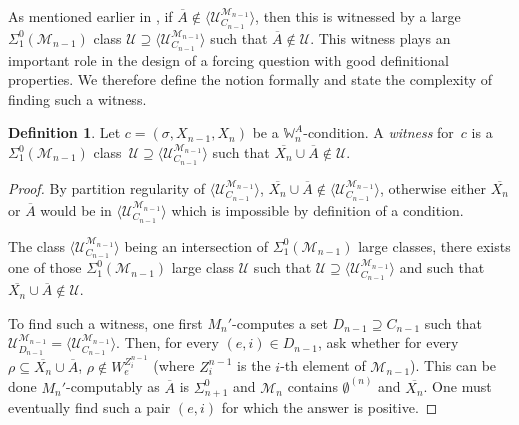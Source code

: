 \documentclass{article}
\def\WW{\mathbb{W}}
\def\U{\mathcal{U}}
\def\M{\mathcal{M}}
\numberwithin{theorem}{section}
\newtheorem{lemma}[theorem]{Lemma}
\theoremstyle{definition}
\newtheorem{definition}[theorem]{Definition}
\begin{document}
As mentioned earlier in , if $\overline{A} \not \in \langle \U_{C_{n-1}}^{\M_{n-1}} \rangle$, then this is witnessed by a large $\Sigma^0_1(\M_{n-1})$ class $\U \supseteq \langle \U_{C_{n-1}}^{\M_{n-1}} \rangle$ such that $\overline{A} \not \in \U$. This witness plays an important role in the design of a forcing question with good definitional properties. We therefore define the notion formally and state the complexity of finding such a witness.

\begin{definition}
Let $c = (\sigma, X_{n-1}, X_{n})$ be a $\WW^A_n$-condition. A \emph{witness} for~$c$ is a $\Sigma^0_1(\M_{n-1})$ class~$\U \supseteq \langle \U_{C_{n-1}}^{\M_{n-1}} \rangle$  such that $\overline{X_{n}} \cup \overline{A} \not \in \U$.
\end{definition}



\begin{proof}
By partition regularity of $\langle \U_{C_{n-1}}^{\M_{n-1}} \rangle$, $\overline{X_n} \cup \overline{A} \notin \langle \U_{C_{n-1}}^{\M_{n-1}} \rangle$, otherwise either $\overline{X_n}$ or $\overline{A}$ would be in $\langle \U_{C_{n-1}}^{\M_{n-1}} \rangle$ which is impossible by definition of a condition.

The class $\langle \U_{C_{n-1}}^{\M_{n-1}} \rangle$ being an intersection of $\Sigma_1^0(\M_{n-1})$ large classes, there exists one of those $\Sigma_1^0(\M_{n-1})$ large class $\U$ such that $\U \supseteq \langle \U_{C_{n-1}}^{\M_{n-1}} \rangle$ and such that $\overline{X_n} \cup \overline{A} \not \in \U$.

To find such a witness, one first $M_n'$-computes a set $D_{n-1} \supseteq C_{n-1}$ such that $\U_{D_{n-1}}^{\M_{n-1}} = \langle \U_{C_{n-1}}^{\M_{n-1}} \rangle$. Then, for every $(e, i) \in D_{n-1}$, ask whether for every $\rho \subseteq \overline{X_n} \cup \overline{A}$, $\rho \not \in W_e^{Z_i^{n-1}}$ (where $Z_i^{n-1}$ is the $i$-th element of $\M_{n-1}$). This can be done $M_n'$-computably as $\overline{A}$ is $\Sigma_{n+1}^0$ and $\M_n$ contains $\emptyset^{(n)}$ and $\overline{X_n}$. One must eventually find such a pair $(e, i)$ for which the answer is positive.    
\end{proof}
\end{document}
